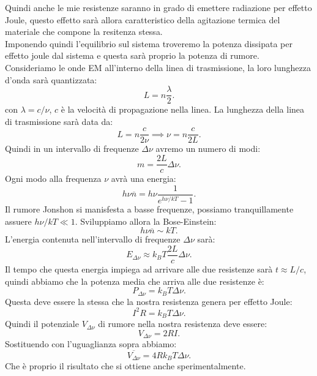 Quindi anche le mie resistenze saranno in grado di emettere radiazione per effetto Joule, questo effetto sarà allora caratteristico della agitazione termica del materiale che compone la resitenza stessa. \\
Imponendo quindi l'equilibrio sul sistema troveremo la potenza dissipata per effetto joule dal sistema e questa sarà proprio la potenza di rumore.\\
Consideriamo le onde EM all'interno della linea di trasmissione, la loro lunghezza d'onda sarà quantizzata:
\[
	L = n \frac{\lambda}{2}
.\] 
con $\lambda = c /\nu $, $c$ è la velocità di propagazione nella linea. La lunghezza della linea di trasmissione sarà data da:
\[
	L = n \frac{c}{2\nu }
	\implies
	\nu = n \frac{c}{2L}
.\] 
Quindi in un intervallo di frequenze $\Delta \nu $ avremo un numero di modi:
\[
	m = \frac{2L}{c}\Delta \nu 
.\] 
Ogni modo alla frequenza $\nu $ avrà una energia:
\[
	h\nu \overline{n} = h\nu \frac{1}{e^{h\nu /kT}-1}
.\] 
Il rumore Jonshon si manisfesta a basse frequenze, possiamo tranquillamente assuere $h\nu /kT \ll 1$. Sviluppiamo allora la Bose-Einstein:
\[
	h\nu \overline{n} \sim kT
.\] 
L'energia contenuta nell'intervallo di frequenze $\Delta \nu $ sarà:
\[
	E_{\Delta \nu } \approx k_BT \frac{2L}{c}\Delta \nu 
.\] 
Il tempo che questa energia impiega ad arrivare alle due resistenze sarà $t\approx L /c$, quindi abbiamo che la potenza media che arriva alle due resistenze è:
\[
	P_{\Delta \nu }= k_B T\Delta \nu 
.\] 
Questa deve essere la stessa che la nostra resistenza genera per effetto Joule:
\[
	I^2R = k_BT\Delta \nu 
.\] 
Quindi il potenziale $V_{\Delta \nu}$ di rumore nella nostra resistenza deve essere:
\[
	V_{\Delta \nu } = 2RI
.\] 
Sostituendo con l'uguaglianza sopra abbiamo:
\[
	\overline{V_{\Delta \nu }}= 4Rk_BT\Delta \nu 
.\] 
Che è proprio il risultato che si ottiene anche sperimentalmente.

